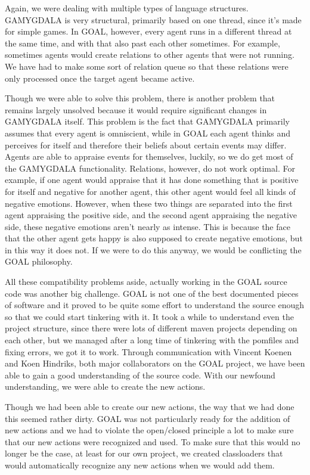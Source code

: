 Again, we were dealing with multiple types of language structures. GAMYGDALA is very structural, primarily based on one thread, since it's made for simple games. In GOAL, however, every agent runs in a different thread at the same time, and with that also past each other sometimes. For example, sometimes agents would create relations to other agents that were not running. We have had to make some sort of relation queue so that these relations were only processed once the target agent became active.

Though we were able to solve this problem, there is another problem that remains largely unsolved because it would require significant changes in GAMYGDALA itself. This problem is the fact that GAMYGDALA primarily assumes that every agent is omniscient, while in GOAL each agent thinks and perceives for itself and therefore their beliefs about certain events may differ. Agents are able to appraise events for themselves, luckily, so we do get most of the GAMYGDALA functionality. Relations, however, do not work optimal. For example, if one agent would appraise that it has done something that is positive for itself and negative for another agent, this other agent would feel all kinds of negative emotions. However, when these two things are separated into the first agent appraising the positive side, and the second agent appraising the negative side, these negative emotions aren't nearly as intense. This is because the face that the other agent gets happy is also supposed to create negative emotions, but in this way it does not. If we were to do this anyway, we would be conflicting the GOAL philosophy.

All these compatibility problems aside, actually working in the GOAL source code was another big challenge. GOAL is not one of the best documented pieces of software and it proved to be quite some effort to understand the source enough so that we could start tinkering with it. It took a while to understand even the project structure, since there were lots of different maven projects depending on each other, but we managed after a long time of tinkering with the pomfiles and fixing errors, we got it to work. Through communication with Vincent Koenen and Koen Hindriks, both major collaborators on the GOAL project, we have been able to gain a good understanding of the source code. With our newfound understanding, we were able to create the new actions.

Though we had been able to create our new actions, the way that we had done this seemed rather dirty. GOAL was not particularly ready for the addition of new actions and we had to violate the open/closed principle a lot to make sure that our new actions were recognized and used. To make sure that this would no longer be the case, at least for our own project, we created classloaders that would automatically recognize any new actions when we would add them.

